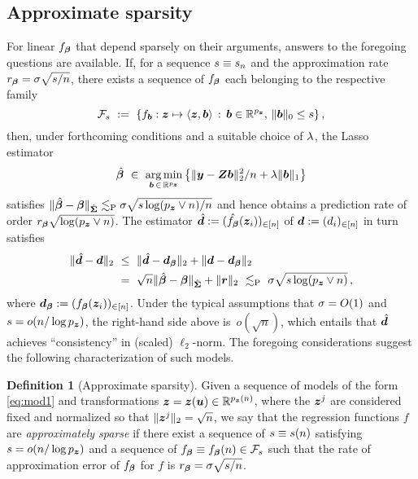 \documentclass{uwstat572}
\newcommand{\be}{\begin{equation}}
\newcommand{\benn}{\begin{equation*}}
\newcommand{\eenn}{\end{equation*}}
\theoremstyle{definition}
\newtheorem{defi}[thm]{Definition}
\theoremstyle{remark}
\newcommand{\R}{\ensuremath{\mathbb{R}}}
\newcommand{\Prb}{\mathrm{P}}
\DeclareMathOperator*{\argmin}{arg\,min}
\newcommand{\bs}[1]{\boldsymbol{#1}}
\numberwithin{equation}{section}
\begin{document}
%
\subsection{Approximate sparsity}

For linear $\fb$ that depend sparsely on their arguments, answers to the foregoing questions are available. If, for a sequence $\sb \equiv \sb_n$ and the approximation rate $\rb = \sd\sqrt{\sb/n}$, there exists a sequence of $\fb$ each belonging to the respective family
\benn
	\fams \ := \ \{ f_{\bs{b}}: \z \mapsto \langle \z, \bs{b}\rangle \,:\, \bs{b} \in \R^{\pz},\, \|\bs{b}\|_0 \leq \sb \} \,,
\eenn
then, under forthcoming conditions and a suitable choice of $\tune$, the Lasso estimator
\benn
	\regbh \ \in \ \argmin_{\bs{b}\,\in\,\R^{\pz}} \big\{ \|\y - \Z\bs{b}\|_2^2/n + \tune\|\bs{b}\|_1 \big\}
\eenn
satisfies $\|\regbh - \regb\|_{\gramhat} \lesssim_\Prb \sd\sqrt{s\log(\pz\vee n)/n}$ and hence obtains a prediction rate of order $\rb\sqrt{\log(\pz\vee n)}$. The estimator $\dhat := (\fbhat(\z_i))_{\inn}$ of $\d := (d_i)_{\inn}$ in turn satisfies
\begin{align}
	\| \dhat -\d \|_2 \ & \leq \  \|\dhat - \db\|_2 + \| \d - \db \|_2 \nonumber\\
	& = \ \sqrt{n}\|\regbh - \regb\|_{\gramhat} + \|\rem\|_2 \ \lesssim_\Prb \ \sd\sqrt{\sb\log(\pz\vee n)} \,,
\end{align}
where $\db := (\fb(\z_i))_{\inn}$. Under the typical assumptions that $\sd = O(1)$ and $\sb = o(n/\log\pz)$, the right-hand side above is~$o(\sqrt{n})$, which entails that $\dhat$ achieves ``consistency'' in (scaled) $\ell_2$-norm. The foregoing considerations suggest the following characterization of such models.

\begin{defi}[Approximate sparsity] Given a sequence of models of the form \eqref{eq:mod1} and transformations $\z = \z(\u) \in \R^{\pz(n)}$, where the $\z^j$ are considered fixed and normalized so that $\|\z^j\|_2 = \sqrt{n}$, we say that the regression functions $f$ are \emph{approximately sparse} if there exist a sequence of $\sb\equiv \sb(n)$ satisfying $\sb = o(n/\log\pz)$ and a sequence of $\fb \equiv \fb(n) \in \fams$ such that the rate of approximation error of $\fb$ for $f$ is $\rb = \sd\sqrt{\sb/n}$.
\end{defi}
\end{document}
